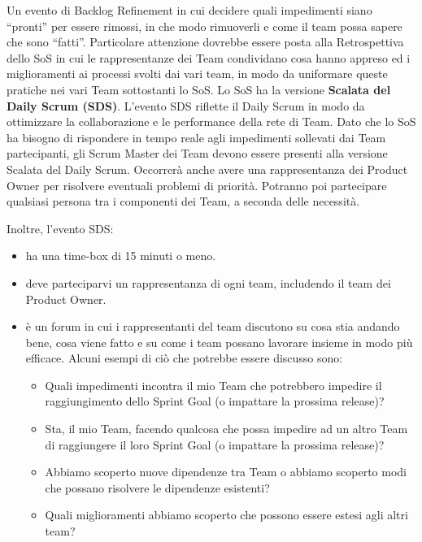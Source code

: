\documentclass[12pt,a4paper,parskip=full]{scrartcl}
\begin{document}
Un evento di Backlog Refinement in cui decidere quali impedimenti siano ``pronti'' per essere rimossi, in che modo rimuoverli e come il team possa sapere che sono ``fatti''. Particolare attenzione dovrebbe essere posta alla Retrospettiva dello SoS in cui le rappresentanze dei Team condividano cosa hanno appreso ed i miglioramenti ai processi svolti dai vari team, in modo da uniformare queste pratiche nei vari Team sottostanti lo SoS.
Lo SoS ha la versione \textbf{Scalata del Daily Scrum (SDS)}. L'evento SDS riflette il Daily Scrum in modo da ottimizzare la collaborazione e le performance della rete di Team. Dato che lo SoS ha bisogno di rispondere in tempo reale agli impedimenti sollevati dai Team partecipanti, gli Scrum Master dei Team devono essere presenti alla versione Scalata del Daily Scrum. Occorrerà anche avere una rappresentanza dei Product Owner per risolvere eventuali problemi di priorità. Potranno poi partecipare qualsiasi persona tra i componenti dei Team, a seconda delle necessità.

Inoltre, l'evento SDS:

\begin{itemize}
\item ha una time-box di 15 minuti o meno.
\item deve parteciparvi un rappresentanza di ogni team, includendo il team dei Product Owner.
\item è un forum in cui i rappresentanti del team discutono su cosa stia andando bene, cosa viene fatto e su come i team possano lavorare insieme in modo più efficace. Alcuni esempi di ciò che potrebbe essere discusso sono:
\begin{itemize}
\item Quali impedimenti incontra il mio Team che potrebbero impedire il raggiungimento dello Sprint Goal (o impattare la prossima release)? 
\item Sta, il mio Team, facendo qualcosa che possa impedire ad un altro Team di raggiungere il loro Sprint Goal (o impattare la prossima release)?
\item Abbiamo scoperto nuove dipendenze tra Team o abbiamo scoperto modi che possano risolvere le dipendenze esistenti?
\item Quali miglioramenti abbiamo scoperto che possono essere estesi agli altri team?
\end{itemize}
\end{itemize}
\end{document}
